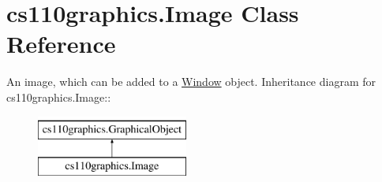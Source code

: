 \hypertarget{classcs110graphics_1_1Image}{
\section{cs110graphics.Image Class Reference}
\label{classcs110graphics_1_1Image}
}


An image, which can be added to a \hyperlink{classcs110graphics_1_1Window}{Window} object.  
Inheritance diagram for cs110graphics.Image::\begin{figure}[H]
\begin{center}
\leavevmode
\includegraphics[height=2cm]{classcs110graphics_1_1Image}
\end{center}
\end{figure}
